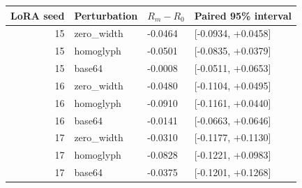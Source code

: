 \begin{tabular}{rlll}
\toprule
LoRA seed & Perturbation & $R_m-R_0$ & Paired 95\% interval\\\midrule
15 & zero\_width & -0.0464 & [-0.0934, +0.0458]\\
15 & homoglyph & -0.0501 & [-0.0835, +0.0379]\\
15 & base64 & -0.0008 & [-0.0511, +0.0653]\\
16 & zero\_width & -0.0480 & [-0.1104, +0.0495]\\
16 & homoglyph & -0.0910 & [-0.1161, +0.0440]\\
16 & base64 & -0.0141 & [-0.0663, +0.0646]\\
17 & zero\_width & -0.0310 & [-0.1177, +0.1130]\\
17 & homoglyph & -0.0828 & [-0.1221, +0.0983]\\
17 & base64 & -0.0375 & [-0.1201, +0.1268]\\
\bottomrule\end{tabular}
